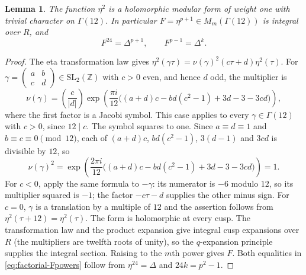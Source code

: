 \documentclass[11pt,a4paper]{article}
\numberwithin{equation}{section}
\newtheorem{lemma}[theorem]{Lemma}
\theoremstyle{definition}
\theoremstyle{remark}
\newcommand{\Z}{\mathbb Z}
\newcommand{\leg}[2]{\left(\frac{#1}{#2}\right)}
\begin{document}
\begin{lemma}\label{lem:eta-level12}
The function $\eta^2$ is a holomorphic modular form of weight one with
trivial character on $\Gamma(12)$. In particular
$F=\eta^{p+1}\in M_m(\Gamma(12))$ is integral over $R$, and
\begin{equation}\label{eq:factorial-Fpowers}
F^{24}=\Delta^{p+1},\qquad F^{p-1}=\Delta^k.
\end{equation}
\end{lemma}
\begin{proof}
The eta transformation law \citep[Ch.~4]{Knopp70} gives
$\eta^2(\gamma\tau)=\nu(\gamma)^2(c\tau+d)\eta^2(\tau)$.
For $\gamma=\begin{pmatrix}a&b\\c&d\end{pmatrix}\in\mathrm{SL}_2(\Z)$ with
$c>0$ even, and hence $d$ odd, the multiplier is
\[
\nu(\gamma)=\leg{c}{|d|}
\exp\!\left(\frac{\pi i}{12}
\bigl((a+d)c-bd(c^2-1)+3d-3-3cd\bigr)\right),
\]
where the first factor is a Jacobi symbol. This case applies to every
$\gamma\in\Gamma(12)$ with $c>0$, since $12\mid c$. The symbol squares to
one. Since $a\equiv d\equiv1$ and $b\equiv c\equiv0\pmod{12}$, each of
$(a+d)c$, $bd(c^2-1)$, $3(d-1)$ and $3cd$ is divisible by $12$, so
\[
\nu(\gamma)^2=
\exp\!\left(\frac{2\pi i}{12}
\bigl((a+d)c-bd(c^2-1)+3d-3-3cd\bigr)\right)=1.
\] For $c<0$, apply the same formula to
$-\gamma$: its numerator is $-6$ modulo $12$, so its multiplier squared
is $-1$; the factor $-c\tau-d$ supplies the other minus sign.
For $c=0$, $\gamma$ is a translation by a multiple of $12$ and the
assertion follows from $\eta^2(\tau+12)=\eta^2(\tau)$.
The form is holomorphic at every cusp. The transformation law and the
product expansion give integral cusp expansions over $R$ (the multipliers
are twelfth roots of unity), so the $q$-expansion principle supplies the
integral section. Raising to the $m$th power gives $F$.
Both equalities in \eqref{eq:factorial-Fpowers} follow from
$\eta^{24}=\Delta$ and $24k=p^2-1$.
\end{proof}
\end{document}
